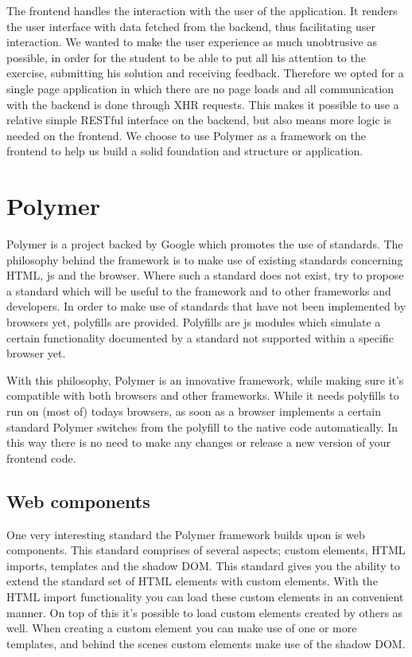 %

The frontend handles the interaction with the user of the application.
It renders the user interface with data fetched from the backend,
thus facilitating user interaction.
We wanted to make the user experience as much unobtrusive as possible,
in order for the student to be able to put all his attention
to the exercise, submitting his solution and receiving feedback.
Therefore we opted for a single page application
in which there are no page loads
and all communication with the backend is done through XHR requests.
This makes it possible
to use a relative simple RESTful interface on the backend,
but also means more logic is needed on the frontend.
We choose to use Polymer as a framework on the frontend
to help us build a solid foundation and structure or application.

\section{Polymer}
Polymer is a project backed by Google which promotes the use of standards.
The philosophy behind the framework is to make use of existing standards
concerning HTML, \gls{js} and the browser.
Where such a standard does not exist,
try to propose a standard which will be useful to the framework
and to other frameworks and developers.
In order to make use of standards
that have not been implemented by browsers yet, polyfills are provided.
Polyfills are \gls{js} modules
which simulate a certain functionality documented by a standard
not supported within a specific browser yet.

With this philosophy, Polymer is an innovative framework,
while making sure it's compatible with both browsers
and other frameworks.
While it needs polyfills to run on (most of) todays browsers,
as soon as a browser implements a certain standard
Polymer switches from the polyfill to the native code automatically.
In this way there is no need to make any changes or release a new version of 
your frontend code.

\subsection{Web components}
One very interesting standard the Polymer framework builds upon
is web components.
This standard comprises of several aspects;
custom elements, HTML imports, templates and the shadow DOM.
This standard gives you the ability
to extend the standard set of HTML elements with custom elements.
With the HTML import functionality you can load these custom elements
in an convenient manner.
On top of this it's possible to load custom elements created by others as well.
When creating a custom element you can make use of one or more templates,
and behind the scenes custom elements make use of the shadow DOM.

